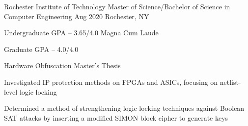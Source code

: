 
\begin{cventries}
  \cvexperience
	{Rochester Institute of Technology}
	{Master of Science/Bachelor of Science in Computer Engineering}
    {Aug 2020}
    {Rochester, NY}
    {
      \begin{cvitems}
	  \item {Undergraduate GPA -- 3.65/4.0 Magna Cum Laude}
	  \item {Graduate GPA -- 4.0/4.0}
      \end{cvitems}
    }

  \cvexperience
  {Hardware Obfuscation}
	{Master's Thesis}
    {}
    {}
    {
		\begin{cvitems}
		\item Investigated IP protection methods on FPGAs and ASICs, focusing on netlist-level logic locking
		\item Determined a method of strengthening logic locking techniques against Boolean SAT attacks by inserting a modified SIMON block cipher to generate keys
		\end{cvitems}
    }

\end{cventries}
